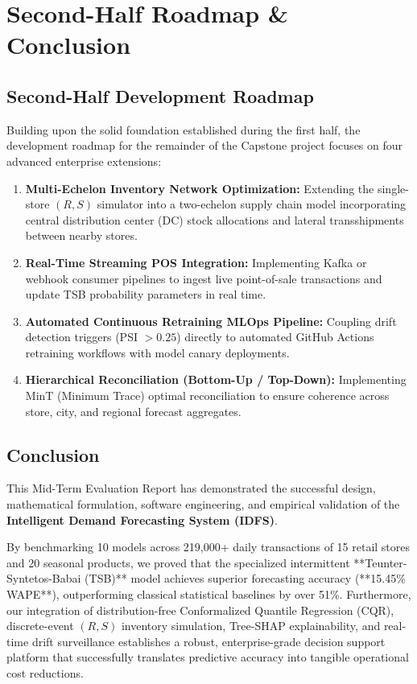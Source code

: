 \documentclass[12pt,a4paper,oneside]{report}
\theoremstyle{definition}
\begin{document}
\newpage
\chapter{Second-Half Roadmap \& Conclusion}

\section{Second-Half Development Roadmap}
Building upon the solid foundation established during the first half, the development roadmap for the remainder of the Capstone project focuses on four advanced enterprise extensions:
\begin{enumerate}[itemsep=0.25cm]
    \item \textbf{Multi-Echelon Inventory Network Optimization:} Extending the single-store $(R, S)$ simulator into a two-echelon supply chain model incorporating central distribution center (DC) stock allocations and lateral transshipments between nearby stores.
    \item \textbf{Real-Time Streaming POS Integration:} Implementing Kafka or webhook consumer pipelines to ingest live point-of-sale transactions and update TSB probability parameters in real time.
    \item \textbf{Automated Continuous Retraining MLOps Pipeline:} Coupling drift detection triggers (PSI $> 0.25$) directly to automated GitHub Actions retraining workflows with model canary deployments.
    \item \textbf{Hierarchical Reconciliation (Bottom-Up / Top-Down):} Implementing MinT (Minimum Trace) optimal reconciliation to ensure coherence across store, city, and regional forecast aggregates.
\end{enumerate}

\section{Conclusion}
This Mid-Term Evaluation Report has demonstrated the successful design, mathematical formulation, software engineering, and empirical validation of the \textbf{Intelligent Demand Forecasting System (IDFS)}. 

By benchmarking 10 models across 219,000+ daily transactions of 15 retail stores and 20 seasonal products, we proved that the specialized intermittent **Teunter-Syntetos-Babai (TSB)** model achieves superior forecasting accuracy (**15.45\% WAPE**), outperforming classical statistical baselines by over 51\%. Furthermore, our integration of distribution-free Conformalized Quantile Regression (CQR), discrete-event $(R, S)$ inventory simulation, Tree-SHAP explainability, and real-time drift surveillance establishes a robust, enterprise-grade decision support platform that successfully translates predictive accuracy into tangible operational cost reductions.
\end{document}

